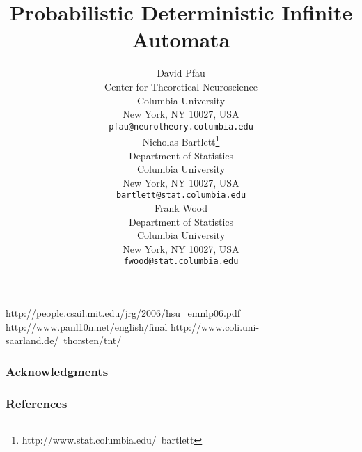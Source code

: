\documentclass{article}
\title{Probabilistic Deterministic Infinite Automata}
\author{
David Pfau \\
Center for Theoretical Neuroscience \\
Columbia University\\
New York, NY 10027, USA \\
\texttt{pfau@neurotheory.columbia.edu} \\
\AND
Nicholas Bartlett\thanks{ http://www.stat.columbia.edu/~bartlett} \\
Department of Statistics\\
Columbia University\\
New York, NY 10027, USA \\
\texttt{bartlett@stat.columbia.edu} \\
\And
Frank Wood \\
Department of Statistics\\
Columbia University\\
New York, NY 10027, USA \\
\texttt{fwood@stat.columbia.edu} \\
}
\begin{document}
\makeanontitle








%









http://people.csail.mit.edu/jrg/2006/hsu\_emnlp06.pdf
http://www.panl10n.net/english/final%
http://www.coli.uni-saarland.de/~thorsten/tnt/

\subsubsection*{Acknowledgments}

\subsubsection*{References}
\begin{small}

 
%
\end{small}
\end{document}

